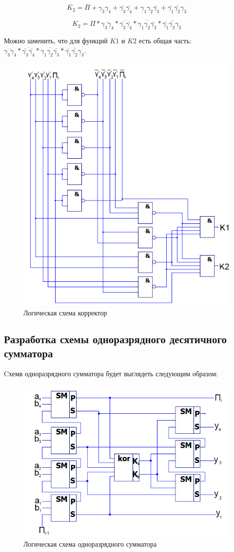 \documentclass[a4paper,14pt]{article}
\begin{document}
$$\overline{K_2} = \overline{\Pi} + \gamma_3 \gamma_4 + \bar{\gamma_3} \bar{\gamma_4} + \gamma_1 \gamma_2 \bar{\gamma_3} + \bar{\gamma_1} \bar{\gamma_2} \gamma_3$$

$$K_2 = \Pi * \overline{\gamma_3 \gamma_4} * \overline{\bar{\gamma_3} \bar{\gamma_4}} * \overline{\gamma_1 \gamma_2 \bar{\gamma_3}} * \overline{\bar{\gamma_1} \bar{\gamma_2} \gamma_3}$$

Можно заменить, что для функций $K1$ и $K2$ есть общая часть: $ \overline{\gamma_3 \gamma_4} * \overline{\bar{\gamma_3} \bar{\gamma_4}} * \overline{\gamma_1 \gamma_2 \bar{\gamma_3}} * \overline{\bar{\gamma_1} \bar{\gamma_2} \gamma_3}$.

\begin{figure}[H]
	\centering
	\includegraphics[width=0.6\linewidth]{images/korr_sh_2}
	\caption{Логическая схема корректор}
	\label{fig:korr_sh}
\end{figure}

\subsection{Разработка схемы одноразрядного десятичного сумматора}

Cхемв одноразрядного сумматора будет выглядеть следующим образом:

\begin{figure}[H]
	\centering
	\includegraphics[width=0.6\linewidth]{images/odnSum_sh}
	\caption{Логическая схема одноразрядного сумматора}
	\label{fig:odnSum_sh}
\end{figure}
\end{document}
